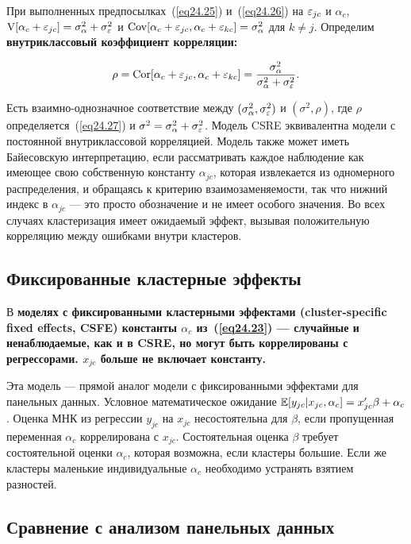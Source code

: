 При выполненных предпосылках~(\ref{eq24.25}) и~(\ref{eq24.26}) на $\varepsilon_{jc}$ и $\alpha_c$, $\mathrm{V}[\alpha_c + \varepsilon_{jc}] = \sigma^2_{\alpha} + \sigma^2_{\varepsilon}$ и $\mathrm{Cov}[\alpha_c + \varepsilon_{jc}, \alpha_c + \varepsilon_{kc}] = \sigma^2_{\alpha}$ для $k \ne j$. Определим \bfseries внутриклассовый коэффициент корреляции: \mdseries

\begin{equation}
\label{eq24.27}
\rho = \mathrm{Cor}[\alpha_c + \varepsilon_{jc}, \alpha_c + \varepsilon_{kc}] = \frac{\sigma^2_{\alpha}}{\sigma^2_{\alpha}+\sigma^2_{\varepsilon}}.
\end{equation}

Есть взаимно-однозначное соответствие между $(\sigma^2_{\alpha}, \sigma^2_{\varepsilon})$ и $(\sigma^2, \rho)$, где $\rho$ определяется~(\ref{eq24.27}) и $\sigma^2 = \sigma^2_{\alpha} + \sigma^2_{\varepsilon}$. Модель CSRE эквивалентна модели с постоянной внутриклассовой корреляцией. Модель также может иметь Байесовскую интерпретацию, если рассматривать каждое наблюдение как имеющее свою собственную константу $\alpha_{jc}$, которая извлекается из одномерного распределения, и обращаясь к критерию взаимозаменяемости, так что нижний индекс в $\alpha_{jc}$ --- это просто обозначение и не имеет особого значения. Во всех случаях кластеризация имеет ожидаемый эффект, вызывая положительную корреляцию между ошибками внутри кластеров. 

\subsection*{Фиксированные кластерные эффекты}

В \bfseries моделях с фиксированными кластерными эффектами \mdseries (cluster-specific fixed effects, CSFE) константы $\alpha_c$ из~(\ref{eq24.23}) --- случайные и ненаблюдаемые, как и в CSRE, но могут быть коррелированы с регрессорами. $x_{jc}$ больше не включает константу. 

Эта модель --- прямой аналог модели с фиксированными эффектами для панельных данных. Условное математическое ожидание $\mathbb{E}[y_{jc}|x_{jc},\alpha_c] = x'_{jc} \beta + \alpha_c$. Оценка МНК из регрессии $y_{jc}$ на $x_{jc}$ несостоятельна для $\beta$, если пропущенная переменная $\alpha_c$ коррелирована с $x_{jc}$. Состоятельная оценка $\beta$ требует состоятельной оценки $\alpha_c$, которая возможна, если кластеры большие. Если же кластеры маленькие индивидуальные $\alpha_c$ необходимо устранять взятием разностей. 

\subsection*{Сравнение с анализом панельных данных}


